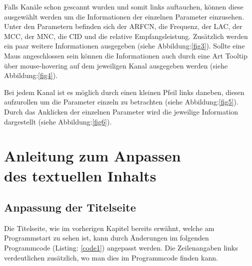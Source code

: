 \noindent Falls Kanäle schon gescannt wurden und somit links auftauchen, können diese ausgewählt werden um die Informationen der einzelnen Parameter einzusehen.
Unter den Parametern befinden sich der \ac{ARFCN}, die Frequenz, der \ac{LAC}, der \ac{MCC}, der \ac{MNC}, die \ac{CID} und die relative Empfangsleistung.
Zusätzlich werden ein paar weitere Informationen ausgegeben (siehe Abbildung:\ref{fig3}).
Sollte eine Maus angeschlossen sein können die Informationen auch durch eine Art Tooltip über mouse-hovering auf dem jeweiligen Kanal ausgegeben werden (siehe Abbildung:\ref{fig4}).




\newpage Bei jedem Kanal ist es möglich durch einen kleinen Pfeil links daneben, diesen aufzurollen um die Parameter einzeln zu betrachten (siehe Abbildung:\ref{fig5}). Durch das Anklicken der einzelnen Parameter wird die jeweilige Information dargestellt (siehe Abbildung:\ref{fig6}).




\newpage
\section[Anleitung zum Anpassen des textuellen Inhalts]{Anleitung zum Anpassen \\ des textuellen Inhalts}

%
%

\subsection*{Anpassung der Titelseite}

%
%
Die Titelseite, wie im vorherigen Kapitel bereits erwähnt, welche am Programmstart zu sehen ist, kann durch Änderungen im folgenden Programmcode (Listing: \ref{code1}) angepasst werden.
Die Zeilenangaben links verdeutlichen zusätzlich, wo man dies im Programmcode finden kann.

